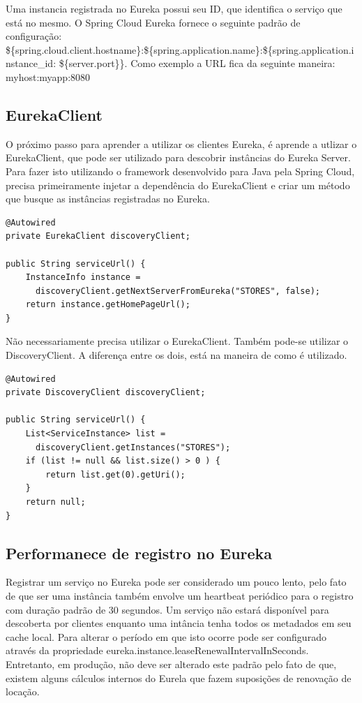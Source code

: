 Uma instancia registrada no Eureka possui seu ID, que identifica o serviço que está no mesmo. O Spring Cloud Eureka fornece o seguinte padrão de configuração: \$\{spring.cloud.client.hostname\}:\$\{spring.application.name\}:\$\{spring.application.instance\_id:
\$\{server.port\}\}. Como exemplo a URL fica da seguinte maneira: myhost:myapp:8080

\subsection{EurekaClient}

O próximo passo para aprender a utilizar os clientes Eureka, é aprende a utlizar o EurekaClient, que pode ser utilizado para descobrir instâncias do Eureka Server. Para fazer isto utilizando o framework desenvolvido para Java pela Spring Cloud, precisa primeiramente injetar a dependência do EurekaClient e criar um método que busque as instâncias registradas no Eureka.

\begin{verbatim}
@Autowired
private EurekaClient discoveryClient;

public String serviceUrl() {
    InstanceInfo instance = 
      discoveryClient.getNextServerFromEureka("STORES", false);
    return instance.getHomePageUrl();
}
\end{verbatim}

Não necessariamente precisa utilizar o EurekaClient. Também pode-se utilizar o DiscoveryClient. A diferença entre os dois, está na maneira de como é utilizado.

\begin{verbatim}
@Autowired
private DiscoveryClient discoveryClient;

public String serviceUrl() {
    List<ServiceInstance> list = 
      discoveryClient.getInstances("STORES");
    if (list != null && list.size() > 0 ) {
        return list.get(0).getUri();
    }
    return null;
}
\end{verbatim}

\subsection{Performanece de registro no Eureka}

Registrar um serviço no Eureka pode ser considerado um pouco lento, pelo fato de que ser uma instância também envolve um heartbeat periódico para o registro com duração padrão de 30 segundos. Um serviço não estará disponível para descoberta por clientes enquanto uma intância tenha todos os metadados em seu cache local. Para alterar o período em que isto ocorre pode ser configurado através da propriedade eureka.instance.leaseRenewalIntervalInSeconds. Entretanto, em produção, não deve ser alterado este padrão pelo fato de que, existem alguns cálculos internos do Eurela que fazem suposições de renovação de locação.


